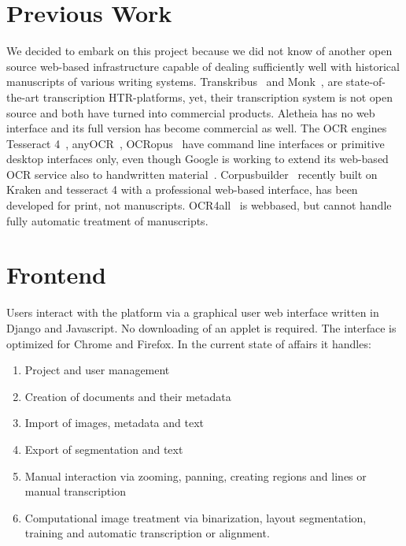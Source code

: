 \section{Previous Work}

We decided to embark on this project because we did not know of another open
source web-based infrastructure capable of dealing sufficiently well with
historical manuscripts of various writing systems. Transkribus~\cite{Kahle} and
Monk~\cite{monk}, \cite{schomaker2016design} are state-of-the-art transcription
HTR-platforms, yet, their transcription system is not open source and both have
turned into commercial
products. Aletheia \cite{aletheia,6065274} has no web interface and its full version has
become commercial as well. The OCR engines Tesseract 4~\cite{tesseract4}, anyOCR~\cite{bukhari2017anyocr}, OCRopus~\cite{ocropy,ocropy3} have command line
interfaces or primitive desktop interfaces only,
even though Google is working to extend its web-based OCR service also to
handwritten material~\cite{walker2018web,ingle2019scalable}.
Corpusbuilder~\cite{corpusbuilder} recently built on Kraken and tesseract 4 with
a professional web-based interface, has been developed for print, not
manuscripts. OCR4all~\cite{reul2019ocr4all} is webbased, but cannot handle fully
automatic treatment of manuscripts.

\section{Frontend}

Users interact with the platform via a graphical user web interface written in
Django and Javascript. No downloading of an applet is required. The interface
is optimized for Chrome and Firefox. In the current state of affairs it
handles:

\begin{enumerate}
\item Project and user management
\item Creation of documents and their metadata
\item Import of images, metadata and text
\item Export of segmentation and text
\item Manual interaction via zooming, panning, creating regions and lines or manual transcription
\item Computational image treatment via binarization, layout segmentation, training and automatic transcription or alignment.
\end{enumerate}


